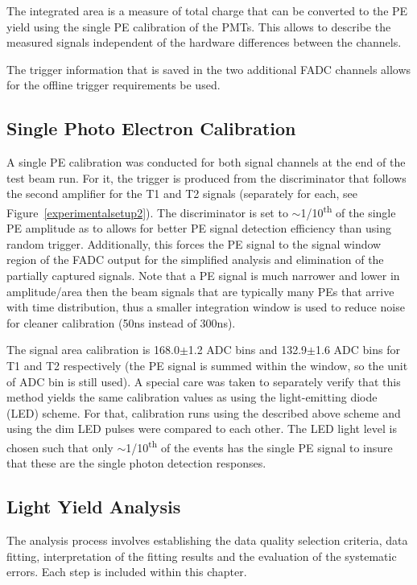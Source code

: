 \documentclass[preprint,12pt]{elsarticle}
\begin{document}
The integrated area is a measure of total charge that can be converted to the PE yield using the single PE calibration of the PMTs. This allows to describe the measured signals independent of the hardware differences between the channels.

The trigger information that is saved in the two additional FADC channels allows for the offline trigger requirements be used.

\subsection{Single Photo Electron Calibration}

A single PE calibration was conducted for both signal channels at the end of the test beam run. For it, the trigger is produced from the discriminator that follows the second amplifier for the T1 and T2 signals (separately for each, see Figure~\ref{experimentalsetup2}). The discriminator is set to $\sim$1/10\textsuperscript{th} of the single PE amplitude as to	allows for better PE signal detection efficiency than using random trigger. Additionally, this forces the PE signal to the signal window region of the FADC output for the simplified analysis and elimination of the partially captured signals. Note that a PE signal is much narrower and lower in amplitude/area then the beam signals that are typically many PEs that arrive with time distribution, thus a smaller integration window is used to reduce noise for cleaner calibration (50ns instead of 300ns).

The signal area calibration is 168.0$\pm$1.2 ADC bins and 132.9$\pm$1.6 ADC bins for T1 and T2 respectively (the PE signal is summed within the window, so the unit of ADC bin is still used). A special care was taken to separately verify that this method yields the same calibration values as using the light-emitting diode (LED) scheme. For that, calibration runs using the described above scheme and using the dim LED pulses were compared to each other. The LED light level is chosen such that only $\sim$1/10\textsuperscript{th} of the events has the single PE signal to insure that these are the single photon detection responses.


\subsection{Light Yield Analysis}

The analysis process involves establishing the data quality selection criteria, data fitting, interpretation of the fitting results and the evaluation of the systematic errors. Each step is included within this chapter.
\end{document}

